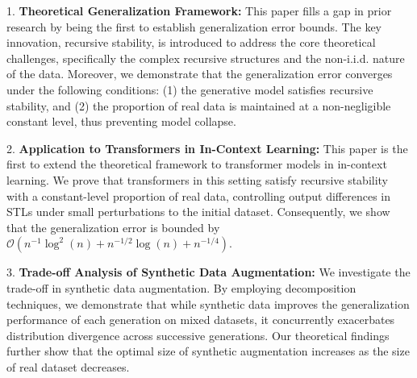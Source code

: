 1. \textbf{Theoretical Generalization Framework:} This paper fills a gap in prior research by being the first to establish generalization error bounds. The key innovation, recursive stability, is introduced to address the core theoretical challenges, specifically the complex recursive structures and the non-i.i.d. nature of the data. Moreover, we demonstrate that the generalization error converges under the following conditions: (1) the generative model satisfies recursive stability, and (2) the proportion of real data is maintained at a non-negligible constant level, thus preventing model collapse.


2. \textbf{Application to Transformers in In-Context Learning:} This paper is the first to extend the theoretical framework to transformer models in in-context learning. We prove that transformers in this setting satisfy recursive stability with a constant-level proportion of real data, controlling output differences in STLs under small perturbations to the initial dataset. Consequently, we show that the generalization error is bounded by $\mathcal{O}(n^{-1}\log^2(n) + n^{-1/2}\log(n) + n^{-1/4})$.

3. \textbf{Trade-off Analysis of Synthetic Data Augmentation:}  We investigate the trade-off in synthetic data augmentation. By employing decomposition techniques, we demonstrate that while synthetic data improves the generalization performance of each generation on mixed datasets, it concurrently exacerbates distribution divergence across successive generations. Our theoretical findings further show that the optimal size of synthetic augmentation increases as the size of real dataset decreases.
